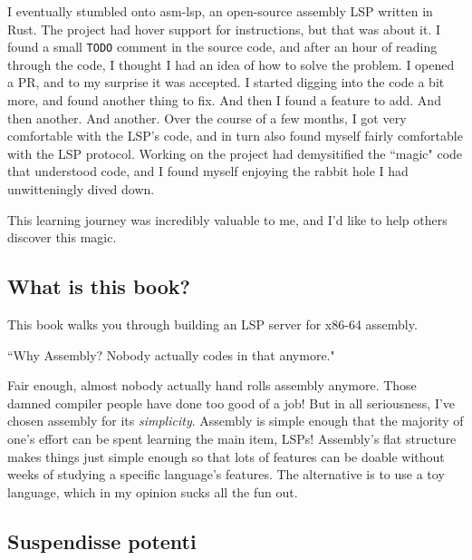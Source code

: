 I eventually stumbled onto asm-lsp, an open-source assembly LSP written in Rust.
The project had hover support for instructions, but that was about it. I found a small \texttt{TODO} comment
in the source code, and after an hour of reading through the code, I thought I had an idea of how to solve the
problem. I opened a PR, and to my surprise it was accepted. I started digging into the code a bit more, and
found another thing to fix. And then I found a feature to add. And then another. And another. Over the course
of a few months, I got very comfortable with the LSP's code, and in turn also found myself fairly 
comfortable with the LSP protocol. Working on the project had demysitified the ``magic" code that understood code,
and I found myself enjoying the rabbit hole I had unwitteningly dived down.

This learning journey was incredibly valuable to me, and I'd like to help others 
discover this magic. 



\subsection{What is this book?}

This book walks you through building an LSP server for x86-64 assembly. 

``Why Assembly? Nobody actually codes in that anymore." 

Fair enough, almost nobody actually hand rolls assembly anymore. Those damned compiler people have done
too good of a job! But in all seriousness, I've chosen assembly for its \textit{simplicity}. Assembly is simple
enough that the majority of one's effort can be spent learning the main item, LSPs! Assembly's flat structure
makes things just simple enough so that lots of features can be doable without weeks of studying a specific
language's features. The alternative is to use a toy language, which in my opinion sucks all the fun out. 

\subsection{Suspendisse potenti}
